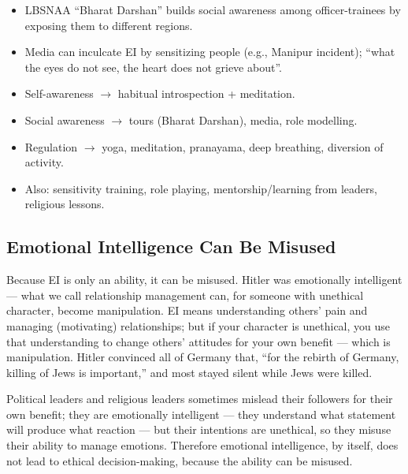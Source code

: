 \begin{GovtPolicy}
\begin{itemize}
\item LBSNAA ``Bharat Darshan'' builds social awareness among officer-trainees by exposing them to different regions.
\item Media can inculcate EI by sensitizing people (e.g., Manipur incident); ``what the eyes do not see, the heart does not grieve about''.
\end{itemize}
\end{GovtPolicy}

\begin{KeyConcept}
\begin{itemize}
\item Self-awareness $\rightarrow$ habitual introspection + meditation.
\item Social awareness $\rightarrow$ tours (Bharat Darshan), media, role modelling.
\item Regulation $\rightarrow$ yoga, meditation, pranayama, deep breathing, diversion of activity.
\item Also: sensitivity training, role playing, mentorship/learning from leaders, religious lessons.
\end{itemize}
\end{KeyConcept}

\subsection{Emotional Intelligence Can Be Misused}

Because EI is only an ability, it can be misused. Hitler was emotionally intelligent --- what we call relationship management can, for someone with unethical character, become manipulation. EI means understanding others' pain and managing (motivating) relationships; but if your character is unethical, you use that understanding to change others' attitudes for your own benefit --- which is manipulation. Hitler convinced all of Germany that, ``for the rebirth of Germany, killing of Jews is important,'' and most stayed silent while Jews were killed.

Political leaders and religious leaders sometimes mislead their followers for their own benefit; they are emotionally intelligent --- they understand what statement will produce what reaction --- but their intentions are unethical, so they misuse their ability to manage emotions. Therefore emotional intelligence, by itself, does not lead to ethical decision-making, because the ability can be misused.

